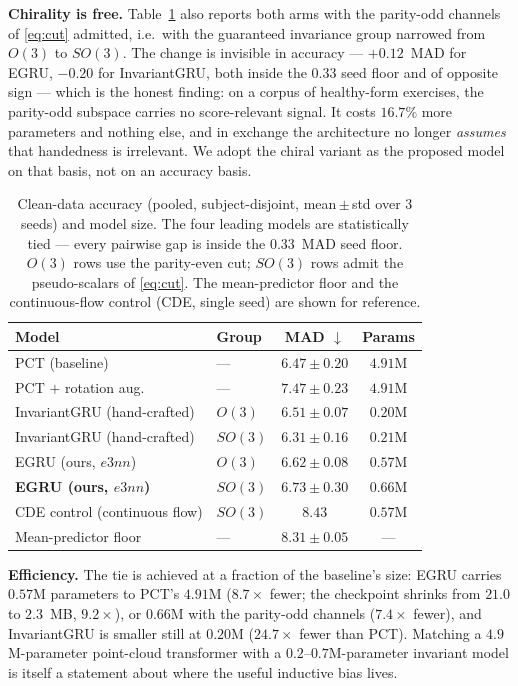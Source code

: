 \textbf{Chirality is free.} Table~\ref{tab:accuracy} also reports both arms with the parity-odd
channels of \eqref{eq:cut} admitted, i.e.\ with the guaranteed invariance group narrowed from $O(3)$
to $SO(3)$. The change is invisible in accuracy --- $+0.12$~MAD for EGRU, $-0.20$ for InvariantGRU,
both inside the $0.33$ seed floor and of opposite sign --- which is the honest finding: on a corpus of
healthy-form exercises, the parity-odd subspace carries no score-relevant signal. It costs $16.7\%$
more parameters and nothing else, and in exchange the architecture no longer \emph{assumes} that
handedness is irrelevant. We adopt the chiral variant as the proposed model on that basis, not on an
accuracy basis.

\begin{table}[!t]
\centering
\caption{Clean-data accuracy (pooled, subject-disjoint, mean\,$\pm$\,std over 3 seeds) and model
size. The four leading models are statistically tied --- every pairwise gap is inside the $0.33$~MAD
seed floor. $O(3)$ rows use the parity-even cut; $SO(3)$ rows admit the pseudo-scalars of
\eqref{eq:cut}. The mean-predictor floor and the continuous-flow control (CDE, single seed) are shown
for reference.}
\label{tab:accuracy}
\small
\setlength{\tabcolsep}{4pt}
\begin{tabular}{llcc}
\toprule
Model & Group & MAD $\downarrow$ & Params \\
\midrule
PCT (baseline)                & --- & $\mathbf{6.47 \pm 0.20}$ & $4.91$M \\
PCT $+$ rotation aug.         & --- & $7.47 \pm 0.23$ & $4.91$M \\
InvariantGRU (hand-crafted)   & $O(3)$  & $\mathbf{6.51 \pm 0.07}$ & $0.20$M \\
InvariantGRU (hand-crafted)   & $SO(3)$ & $\mathbf{6.31 \pm 0.16}$ & $0.21$M \\
EGRU (ours, $e3nn$)           & $O(3)$  & $\mathbf{6.62 \pm 0.08}$ & $0.57$M \\
\textbf{EGRU (ours, $e3nn$)}  & $SO(3)$ & $\mathbf{6.73 \pm 0.30}$ & $0.66$M \\
\midrule
CDE control (continuous flow) & $SO(3)$ & $8.43$\phantom{$\,\pm0.00$} & $0.57$M \\
Mean-predictor floor          & --- & $8.31 \pm 0.05$ & --- \\
\bottomrule
\end{tabular}
\end{table}

\textbf{Efficiency.} The tie is achieved at a fraction of the baseline's size: EGRU carries
$0.57$M parameters to PCT's $4.91$M ($8.7\times$ fewer; the checkpoint shrinks from $21.0$ to
$2.3$~MB, $9.2\times$), or $0.66$M with the parity-odd channels ($7.4\times$ fewer), and InvariantGRU
is smaller still at $0.20$M ($24.7\times$ fewer than PCT). Matching a $4.9$M-parameter point-cloud
transformer with a $0.2$--$0.7$M-parameter invariant model is itself a statement about where the
useful inductive bias lives.

